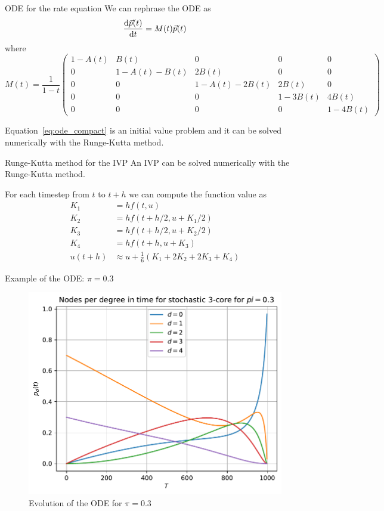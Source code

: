 \documentclass[handout]{beamer}
\begin{document}
\begin{frame}{ODE for the rate equation}
    We can rephrase the ODE as
    \begin{equation}
        \dv{\vec p(t)}{t} = M(t) \vec p(t)
        \label{eq:ode_compact}
    \end{equation}
    where
    {\scriptsize
    $$
    M(t) = \frac{1}{1-t}
    \begin{pmatrix}
        1-A(t) & B(t) & 0 & 0 & 0\\
        0 & 1-A(t)-B(t) & 2B(t) & 0 & 0\\
        0 & 0 & 1-A(t)-2B(t) & 2B(t) & 0\\
        0 & 0 & 0 & 1-3B(t) & 4B(t)\\
        0 & 0 & 0 & 0 & 1-4B(t)
    \end{pmatrix}
    $$
    }

    Equation~\ref{eq:ode_compact} is an initial value problem and it can be
    solved numerically with the \alert{Runge-Kutta} method.
\end{frame}

\begin{frame}{Runge-Kutta method for the IVP}
    An IVP can be solved numerically with the \alert{Runge-Kutta} method. 

    For each timestep from $t$ to $t+h$ we can compute \cite{oderk} the function
    value as
    \begin{align}
        K_1 &= h f(t, u)\\
        K_2 &= h f(t + h/2, u + K_1/2)\\
        K_3 &= h f(t + h/2, u + K_2/2)\\
        K_4 &= h f(t + h, u + K_3)\\
        u(t+h) &\approx u + \frac{1}{6}(K_1 + 2 K_2 + 2 K_3 + K_4)
    \end{align}
\end{frame}

\begin{frame}{Example of the ODE: $\pi=0.3$}
    \begin{figure}
        \centering
        \includegraphics[width=.6\textwidth]{ode_evol_pi03.pdf}
        \caption{Evolution of the ODE for $\pi=0.3$}
        \label{ref:ode_evol_pi03}
    \end{figure}
\end{frame}
\end{document}
